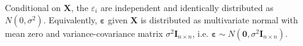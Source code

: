 \begin{assumption}
    Conditional on $\mathbf{X}$, the $\varepsilon_i$ are independent and identically distributed as $N(0, \sigma^2)$. Equivalently, $\boldsymbol{\varepsilon}$ given $\mathbf{X}$ is distributed as multivariate normal with mean zero and variance-covariance matrix $\sigma^2 \mathbf{I}_{n \times n}$, i.e. $\boldsymbol{\varepsilon} \sim N(\mathbf{0}, \sigma^2 \mathbf{I}_{n \times n})$.
\end{assumption}